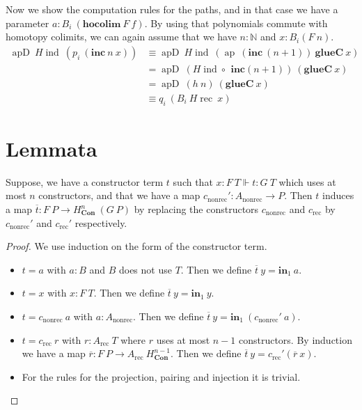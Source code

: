 \documentclass[a4paper,UKenglish]{lipics-v2016}
\newcommand{\Boperator}[1]{\mathrm{\mathbf{#1}}}
\newcommand{\inn}{\Boperator{in}}
\newcommand{\comp}[0]{\circ \,}
\newcommand{\frec}[0]{\!\operatorname{rec}}
\newcommand{\ind}[0]{\!\operatorname{ind}}
\newcommand{\rec}[0]{\operatorname{rec}}
\newcommand{\nonrec}[0]{\operatorname{nonrec}}
\newcommand{\ap}[0]{\operatorname{ap}}
\newcommand{\apd}[0]{\operatorname{apD}}
\newcommand{\Con}[0]{\textbf{Con}}
\newcommand{\glueC}[0]{\Boperator{glueC}}
\newcommand{\hocolim}[0]{\Boperator{hocolim}}
\newcommand{\inc}[0]{\Boperator{inc}}
\begin{document}
Now we show the computation rules for the paths, and in that case we have a parameter $a : B_i \> (\hocolim \> F \> f)$.
By using that polynomials commute with homotopy colimits, we can again assume that we have $n : \mathbb{N}$ and $x : B_i(F \> n)$.
\begin{equation*}
\begin{split}
\apd \> H\ind \> (p_i \> (\inc \> n \> x))
&\equiv \apd \> H\ind \> (\ap \> (\inc \> (n+1)) \> \glueC \> x)\\
&= \apd \> (H\ind \comp  \> \inc (n+1)) \> (\glueC \> x)\\
&= \apd \> (h \> n) \> (\glueC \> x)\\
&\equiv q_i \> (B_i \> H\frec \> x)
\end{split}
\end{equation*}


\section{Lemmata}
\label{sec:Lemmata}
\begin{lemma}
\label{lem:constrTerm}
Suppose, we have a constructor term $t$ such that $x : F \> T \Vdash t : G \>T$ which uses at most $n$ constructors, and that we have a map $c_{\nonrec}' : A_{\nonrec} \rightarrow P$.
Then $t$ induces a map $\overline{t} : F \> P \rightarrow H_{\Con}^n \> (G \> P)$ by replacing the constructors $c_{\nonrec}$ and $c_{\rec}$ by $c_{\nonrec}'$ and $c_{\rec}'$ respectively.
\end{lemma}

\begin{proof}
We use induction on the form of the constructor term.
\begin{itemize}
        \item $t = a$ with $a : B$ and $B$ does not use $T$. Then we define $\overline{t} \> y = \inn_1 \> a$.
        \item $t = x$ with $x : F \> T$. Then we define $\overline{t} \> y = \inn_1 \> y$.
        \item $t = c_{\nonrec} \> a$ with $a : A_{\nonrec}$. Then we define $\overline{t} \> y = \inn_1 \> (c_{\nonrec}' \> a)$.
        \item $t = c_{\rec} \> r$ with $r : A_{\rec} \> T$ where $r$ uses at most $n-1$ constructors. 
        By induction we have a map $\overline{r} : F \> P \rightarrow A_{\rec} \> H_{\Con}^{n-1}$.
        Then we define $\overline{t} \> y = c_{\rec}' (\overline{r} \> x)$.
        \item For the rules for the projection, pairing and injection it is trivial. \qedhere
\end{itemize}
\end{proof}
\end{document}
